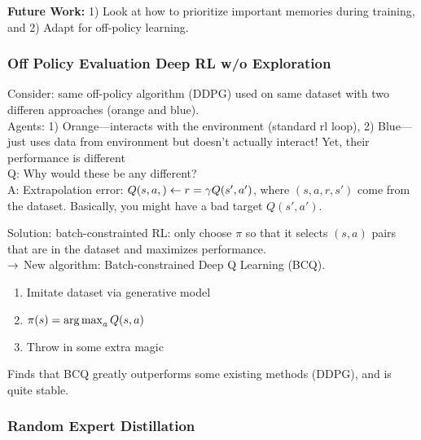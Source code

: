 {\bf Future Work:} 1) Look at how to prioritize important memories during training, and 2) Adapt for off-policy learning. \\

\subsubsection{Off Policy Evaluation Deep RL w/o Exploration}

Consider: same off-policy algorithm (DDPG) used on same dataset with two differen approaches (orange and blue). \\

Agents: 1) Orange---interacts with the environment (standard rl loop), 2) Blue---just uses data from environment but doesn't actually interact! Yet, their performance is different \\

Q: Why would these be any different? \\

A: Extrapolation error: $Q(s,a,) \leftarrow r = \gamma Q(s',a')$, where $(s,a,r,s')$ come from the dataset. Basically, you might have a bad target $Q(s',a')$.\\


Solution: batch-constrainted RL: only choose $\pi$ so that it selects $(s,a)$ pairs that are  in the dataset and maximizes performance. \\

$\rightarrow$ New algorithm: Batch-constrained Deep Q Learning (BCQ). \\
\begin{enumerate}
    \item Imitate dataset via generative model
    \item $\pi(s) = \operatorname*{arg\,max}_a Q(s,a)$
    \item Throw in some extra magic
\end{enumerate}

Finds that BCQ greatly outperforms some existing methods (DDPG), and is quite stable. \\

\spacerule

\subsubsection{Random Expert Distillation}

